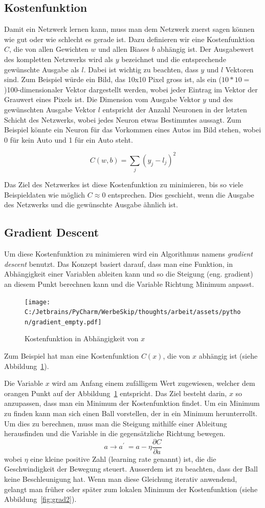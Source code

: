\documentclass[12pt,a4paper]{report}
\begin{document}
\subsection{Kostenfunktion}
Damit ein Netzwerk lernen kann, muss man dem Netzwerk zuerst sagen können wie gut oder wie schlecht es gerade ist.
Dazu definieren wir eine Kostenfunktion $C$, die von allen Gewichten $w$ und allen Biases $b$ abhängig ist.
Der Ausgabewert des kompletten Netzwerks wird als $y$ bezeichnet und die entsprechende gewünschte Ausgabe als $l$.
Dabei ist wichtig zu beachten, dass $y$ und $l$ Vektoren sind.
Zum Beispiel würde ein Bild, das 10x10 Pixel gross ist, als ein ($10 * 10 =$)100-dimensionaler Vektor dargestellt werden,
wobei jeder Eintrag im Vektor der Grauwert eines Pixels ist.
Die Dimension vom Ausgabe Vektor $y$ und des gewünschten Ausgabe Vektor $l$ entspricht der Anzahl Neuronen in der letzten Schicht des Netzwerks,
wobei jedes Neuron etwas Bestimmtes aussagt.
Zum Beispiel könnte ein Neuron für das Vorkommen eines Autos im Bild stehen, wobei 0 für kein Auto und 1 für ein Auto steht.

\[C(w,b) = \sum_{j}(y_j - l_j)^2\]

Das Ziel des Netzwerkes ist diese Kostenfunktion zu minimieren, bis so viele Beispieldaten wie möglich $C \approx 0$ entsprechen.
Dies geschieht, wenn die Ausgabe des Netzwerks und die gewünschte Ausgabe ähnlich ist.
\subsection{Gradient Descent}
Um diese Kostenfunktion zu minimieren wird ein Algorithmus namens \textit{gradient descent} benutzt.
Das Konzept basiert darauf, dass man eine Funktion, in Abhängigkeit einer Variablen ableiten kann und so die Steigung (eng. gradient)
an diesem Punkt berechnen kann und die Variable Richtung Minimum anpasst.

\begin{figure}[!h]%
    \centering
    \texttt{[image: C:/Jetbrains/PyCharm/WerbeSkip/thoughts/arbeit/assets/python/gradient\_empty.pdf]} %
    \caption{Kostenfunktion in Abhängigkeit von $x$}%
    \label{fig:grad1}%
\end{figure}

Zum Beispiel hat man eine Kostenfunktion $C(x)$, die von $x$ abhängig ist (siehe Abbildung~\ref{fig:grad1}).

Die Variable $x$ wird am Anfang einem zufälligem Wert zugewiesen,
welcher dem orangen Punkt auf der Abbildung~\ref{fig:grad1} entspricht.
Das Ziel besteht darin, $x$ so anzupassen,
dass man ein Minimum der Kostenfunktion findet.
Um ein Minimum zu finden kann man sich einen Ball vorstellen, der in ein Minimum herunterrollt.
Um dies zu berechnen, muss man die Steigung mithilfe einer Ableitung herausfinden und die Variable in die
gegensätzliche Richtung bewegen.
\[a \rightarrow a^\prime\ = a - \eta\frac{\partial C}{\partial a}\]
wobei $\eta$ eine kleine positive Zahl (learning rate genannt) ist, die die Geschwindigkeit der Bewegung steuert.
Ausserdem ist zu beachten, dass der Ball keine Beschleunigung hat.
Wenn man diese Gleichung iterativ anwendend, gelangt man früher oder später zum lokalen Minimum der Kostenfunktion (siehe Abbildung~\ref{fig:grad2}).
\end{document}
